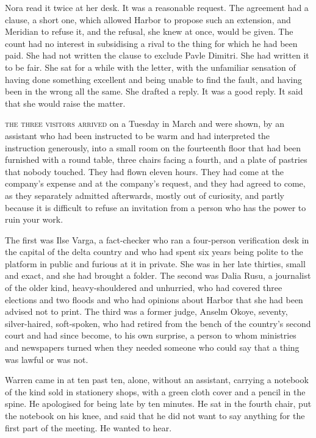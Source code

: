 Nora read it twice at her desk. It was a reasonable request. The agreement had a clause, a short one, which allowed Harbor to propose such an extension, and Meridian to refuse it, and the refusal, she knew at once, would be given. The count had no interest in subsidising a rival to the thing for which he had been paid. She had not written the clause to exclude Pavle Dimitri. She had written it to be fair. She sat for a while with the letter, with the unfamiliar sensation of having done something excellent and being unable to find the fault, and having been in the wrong all the same. She drafted a reply. It was a good reply. It said that she would raise the matter.


\textsc{the three visitors arrived} on a Tuesday in March and were shown, by an assistant who had been instructed to be warm and had interpreted the instruction generously, into a small room on the fourteenth floor that had been furnished with a round table, three chairs facing a fourth, and a plate of pastries that nobody touched. They had flown eleven hours. They had come at the company's expense and at the company's request, and they had agreed to come, as they separately admitted afterwards, mostly out of curiosity, and partly because it is difficult to refuse an invitation from a person who has the power to ruin your work.

The first was Ilse Varga, a fact-checker who ran a four-person verification desk in the capital of the delta country and who had spent six years being polite to the platform in public and furious at it in private. She was in her late thirties, small and exact, and she had brought a folder. The second was Dalia Rusu, a journalist of the older kind, heavy-shouldered and unhurried, who had covered three elections and two floods and who had opinions about Harbor that she had been advised not to print. The third was a former judge, Anselm Okoye, seventy, silver-haired, soft-spoken, who had retired from the bench of the country's second court and had since become, to his own surprise, a person to whom ministries and newspapers turned when they needed someone who could say that a thing was lawful or was not.

Warren came in at ten past ten, alone, without an assistant, carrying a notebook of the kind sold in stationery shops, with a green cloth cover and a pencil in the spine. He apologised for being late by ten minutes. He sat in the fourth chair, put the notebook on his knee, and said that he did not want to say anything for the first part of the meeting. He wanted to hear.

